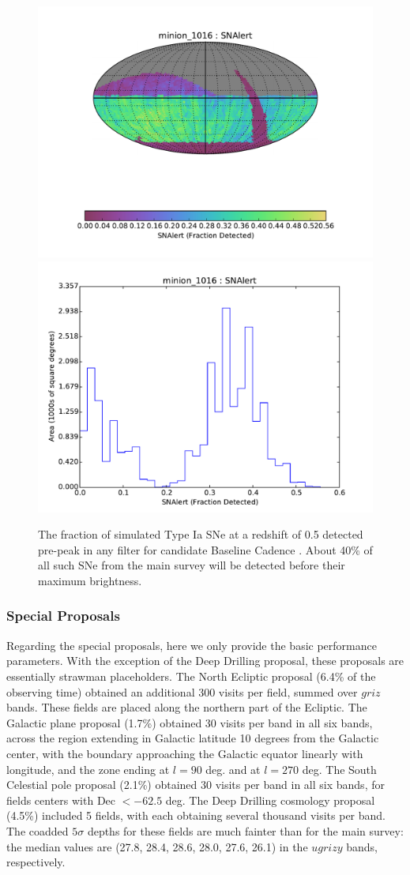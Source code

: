 \begin{figure}[h!]
\vskip -0.0in
\includegraphics[angle=0,width=0.49\hsize,clip]{figs/cadence/minion_1016_SNAlert_HEAL_SkyMap.pdf}
\includegraphics[angle=0,width=0.49\hsize,clip]{figs/cadence/minion_1016_SNAlert_HEAL_Histogram.pdf}
\vskip -0.1in

\caption{The fraction of simulated Type Ia SNe at a redshift of 0.5 detected
pre-peak in any filter for candidate Baseline Cadence . About
40\% of all such SNe from the main survey will be detected before their
maximum brightness.}
\label{fig:enigmaEarlySNe}
\end{figure}



\subsubsection{Special Proposals}

Regarding the special proposals, here we only provide the basic
performance parameters. With the exception of the Deep Drilling
proposal, these proposals are essentially strawman placeholders. The
North Ecliptic proposal (6.4\% of the observing time) obtained an
additional 300 visits per field, summed over $griz$ bands. These
fields are placed along the northern part of the Ecliptic. The
Galactic plane proposal (1.7\%) obtained 30 visits per band in all six
bands, across the region extending in Galactic latitude 10 degrees
from the Galactic center, with the boundary approaching the Galactic
equator linearly with longitude, and the zone ending at $l=90$ deg.
and at $l=270$ deg. The South Celestial pole proposal (2.1\%) obtained
30 visits per band in all six bands, for fields centers with Dec $<
-62.5$ deg. The Deep Drilling cosmology proposal (4.5\%) included 5
fields, with each obtaining several thousand visits per band. The
coadded $5\sigma$ depths for these fields are much fainter than for
the main survey: the median values are (27.8, 28.4, 28.6, 28.0, 27.6,
26.1) in the $ugrizy$ bands, respectively.


